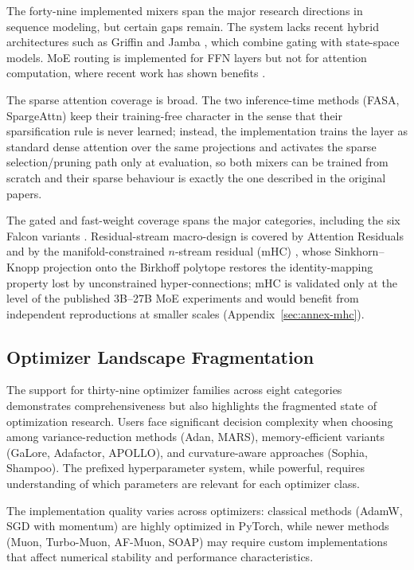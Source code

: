 The forty-nine implemented mixers span the major research directions in sequence modeling, but certain gaps remain. The system lacks recent hybrid architectures such as Griffin \citep{soares_griffin_2024} and Jamba \citep{gu_jamba_2024}, which combine gating with state-space models. MoE routing is implemented for FFN layers but not for attention computation, where recent work has shown benefits \citep{lewis_moe_2021}.

The sparse attention coverage is broad. The two inference-time methods (FASA, SpargeAttn) keep their training-free character in the sense that their sparsification rule is never learned; instead, the implementation trains the layer as standard dense attention over the same projections and activates the sparse selection/pruning path only at evaluation, so both mixers can be trained from scratch and their sparse behaviour is exactly the one described in the original papers.

The gated and fast-weight coverage spans the major categories, including the six Falcon variants \citep{zhang_falcon_2026}. Residual-stream macro-design is covered by Attention Residuals \citep{sun_attnres_2026} and by the manifold-constrained $n$-stream residual (mHC) \citep{xie_mhc_2025}, whose Sinkhorn--Knopp projection onto the Birkhoff polytope restores the identity-mapping property lost by unconstrained hyper-connections; mHC is validated only at the level of the published 3B--27B MoE experiments and would benefit from independent reproductions at smaller scales (Appendix~\ref{sec:annex-mhc}).

\subsection{Optimizer Landscape Fragmentation}

The support for thirty-nine optimizer families across eight categories demonstrates comprehensiveness but also highlights the fragmented state of optimization research. Users face significant decision complexity when choosing among variance-reduction methods (Adan, MARS), memory-efficient variants (GaLore, Adafactor, APOLLO), and curvature-aware approaches (Sophia, Shampoo). The prefixed hyperparameter system, while powerful, requires understanding of which parameters are relevant for each optimizer class.

The implementation quality varies across optimizers: classical methods (AdamW, SGD with momentum) are highly optimized in PyTorch, while newer methods (Muon, Turbo-Muon, AF-Muon, SOAP) may require custom implementations that affect numerical stability and performance characteristics.

